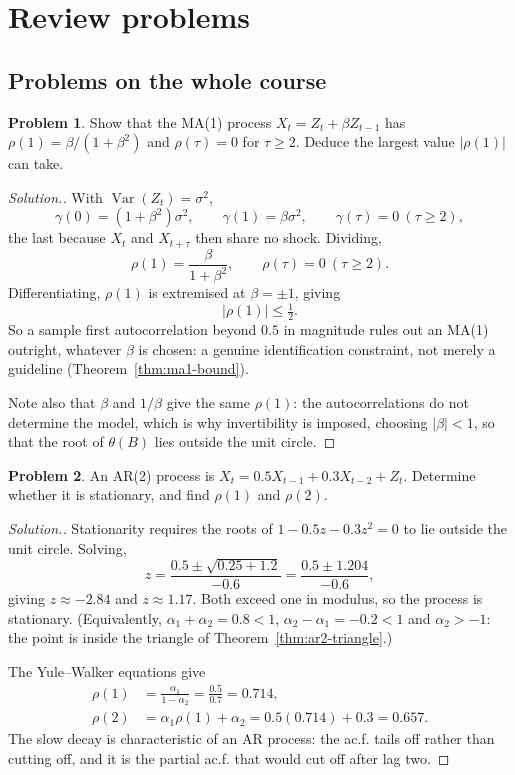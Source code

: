 \documentclass[11pt,a4paper]{article}
\theoremstyle{definition}
\newtheorem{problemx}{Problem}[subsection]
\newenvironment{problem}{\begin{problemx}}{\end{problemx}}
\newenvironment{solution}
  {\renewcommand{\qedsymbol}{}\begin{proof}[\textit{Solution}.]}
  {\end{proof}}
\DeclareMathOperator{\Var}{Var}
\begin{document}
\section{Review problems}\label{sec:review}
\subsection{Problems on the whole course}
\begin{problem}
Show that the MA(1) process $X_t = Z_t + \beta Z_{t-1}$ has $\rho(1) = \beta/(1 + \beta^2)$ and $\rho(\tau) = 0$ for $\tau \ge 2$. Deduce the largest value $|\rho(1)|$ can
take.
\end{problem}
\begin{solution}
With $\Var(Z_t) = \sigma^2$,
\[
\gamma(0) = (1 + \beta^2)\sigma^2 , \qquad \gamma(1) = \beta\sigma^2 , \qquad \gamma(\tau) = 0 \ (\tau \ge 2) ,
\]
the last because $X_t$ and $X_{t+\tau}$ then share no shock. Dividing,
\[
\rho(1) = \frac{\beta}{1 + \beta^2} , \qquad \rho(\tau) = 0 \ (\tau \ge 2) .
\]
Differentiating, $\rho(1)$ is extremised at $\beta = \pm1$, giving
\[
|\rho(1)| \le \tfrac12 .
\]
So a sample first autocorrelation beyond $0.5$ in magnitude rules out an MA(1) outright, whatever $\beta$ is chosen: a
genuine identification constraint, not merely a guideline (Theorem~\ref{thm:ma1-bound}).

Note also that $\beta$ and $1/\beta$ give the same $\rho(1)$: the autocorrelations do not determine the model, which is why
invertibility is imposed, choosing $|\beta| < 1$, so that the root of $\theta(B)$ lies outside the unit circle.
\end{solution}

\begin{problem}
An AR(2) process is $X_t = 0.5X_{t-1} + 0.3X_{t-2} + Z_t$. Determine whether it is stationary, and find $\rho(1)$ and $\rho(2)$.
\end{problem}
\begin{solution}
Stationarity requires the roots of $1 - 0.5z - 0.3z^2 = 0$ to lie outside the unit circle. Solving,
\[
z = \frac{0.5 \pm \sqrt{0.25 + 1.2}}{-0.6} = \frac{0.5 \pm 1.204}{-0.6} ,
\]
giving $z \approx -2.84$ and $z \approx 1.17$. Both exceed one in modulus, so the process is stationary. (Equivalently, $\alpha_1 + \alpha_2 = 0.8 < 1$,
$\alpha_2 - \alpha_1 = -0.2 < 1$ and $\alpha_2 > -1$: the point is inside the triangle of Theorem~\ref{thm:ar2-triangle}.)

The Yule--Walker equations give
\begin{align*}
\rho(1) &= \frac{\alpha_1}{1 - \alpha_2} = \frac{0.5}{0.7} = 0.714 , \\
\rho(2) &= \alpha_1\rho(1) + \alpha_2 = 0.5(0.714) + 0.3 = 0.657 .
\end{align*}
The slow decay is characteristic of an AR process: the ac.f. tails off rather than cutting off, and it is the partial
ac.f. that would cut off after lag two.
\end{solution}
\end{document}
